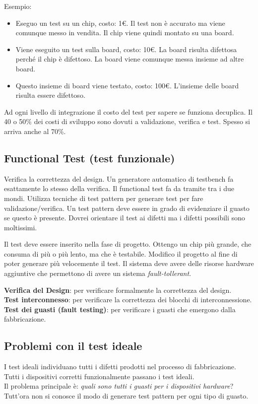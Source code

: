 \documentclass[a4paper]{article}
\theoremstyle{definition}
\begin{document}
		Esempio:
		\begin{itemize}
			\item Eseguo un test su un chip, costo: 1€. Il test non è accurato ma viene comunque messo in vendita. Il chip viene quindi montato su una board.
			\item Viene eseguito un test sulla board, costo: 10€. La board risulta difettosa perché il chip è difettoso. La board viene comunque messa insieme ad altre board.
			\item Questo insieme di board viene testato, costo: 100€. L'insieme delle board risulta essere difettoso.
		\end{itemize}
		Ad ogni livello di integrazione il costo del test per sapere se funziona decuplica.
		Il 40 o 50\% dei costi di sviluppo sono dovuti a validazione, verifica e test. Spesso si arriva anche al 70\%. 
		
		\subsection{Functional Test (test funzionale)} 
			Verifica la correttezza del design. Un generatore automatico di testbench fa esattamente lo stesso della verifica. Il functional test fa da tramite tra i due mondi. 
			Utilizza tecniche di test pattern per generare test per fare validazione/verifica. 
			Un test pattern deve essere in grado di evidenziare il guasto se questo è presente. Dovrei orientare il test ai difetti ma i difetti possibili sono moltissimi. 
			
			Il test deve essere inserito nella fase di progetto. Ottengo un chip più grande, che consuma di più o più lento, ma che è testabile. Modifico il progetto al fine di poter generare più velocemente il test. 
			Il sistema deve avere delle risorse hardware aggiuntive che permettono di avere un sistema \textit{fault-tollerant}.
			
			\textbf{Verifica del Design}: per verificare formalmente la correttezza del design.\\
			\textbf{Test interconnesso}: per verificare la correttezza dei blocchi di interconnessione.\\
			\textbf{Test dei guasti (fault testing)}: per verificare i guasti che emergono dalla fabbricazione.
			
		\subsection{Problemi con il test ideale}
			I test ideali individuano tutti i difetti prodotti nel processo di fabbricazione. Tutti i dispositivi corretti funzionalmente passano i test ideali.\\
			Il problema principale è: \textit{quali sono tutti i guasti per i dispositivi hardware}? Tutt'ora non si conosce il modo di generare test pattern per ogni tipo di guasto.
			
\end{document}
